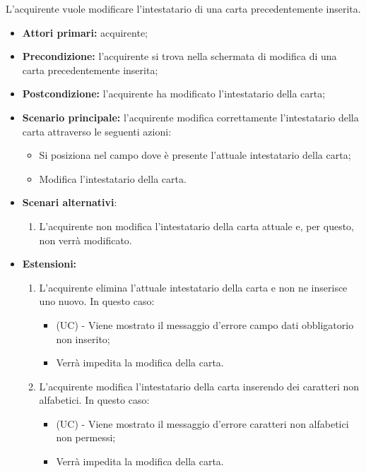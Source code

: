 L'acquirente vuole modificare l'intestatario di una carta precedentemente inserita.
\begin{itemize}
    \item \textbf{Attori primari:} acquirente;
    \item \textbf{Precondizione:} l'acquirente si trova nella schermata di modifica di una carta precedentemente inserita;
    \item \textbf{Postcondizione:} l'acquirente ha modificato l'intestatario della carta;
    \item \textbf{Scenario principale:} l'acquirente modifica correttamente l'intestatario della carta attraverso le seguenti azioni:
    \begin{itemize}
        \item Si posiziona nel campo dove è presente l'attuale intestatario della carta;
        \item Modifica l'intestatario della carta.
    \end{itemize}
    \item \textbf{Scenari alternativi}:
    \begin{enumerate}[label=\lett]
        \item L'acquirente non modifica l'intestatario della carta attuale e, per questo, non verrà modificato.
    \end{enumerate}
    \item \textbf{Estensioni:}
    \begin{enumerate}[label=\lett]
        \item L'acquirente elimina l'attuale intestatario della carta e non ne inserisce uno nuovo. In questo caso:
        \begin{itemize}
            \item (UC) - Viene mostrato il messaggio d'errore campo dati obbligatorio non inserito;
            \item Verrà impedita la modifica della carta.
        \end{itemize}
        \item L'acquirente modifica l'intestatario della carta inserendo dei caratteri non alfabetici. In questo caso:
        \begin{itemize}
            \item (UC) - Viene mostrato il messaggio d'errore caratteri non alfabetici non permessi;
            \item Verrà impedita la modifica della carta.
        \end{itemize}
    \end{enumerate}
\end{itemize}

